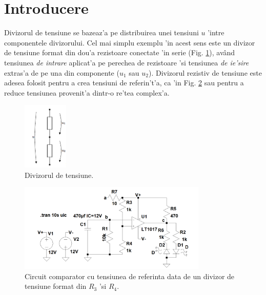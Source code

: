 \section{Introducere}

\begin{summary}
  Divizorul de tensiune se bazeaz'a pe distribuirea unei tensiuni $u$ 'intre componentele divizorului. Cel mai simplu exemplu 'in acest sens este un divizor de tensiune format din dou'a rezistoare conectate 'in serie (Fig. \ref{fig:divizor_schema_exemplu}), av\^and tensiunea \textit{de intrare} aplicat'a pe perechea de rezistoare 'si tensiunea \textit{de ie'sire} extras'a de pe una din componente ($u_1$ sau $u_2$). Divizorul rezistiv de tensiune este adesea folosit pentru a crea tensiuni de referin't'a, ca 'in Fig. \ref{fig:comparator_cu_divizor} sau pentru a reduce tensiunea provenit'a dintr-o re'tea complex'a.
\end{summary}

\begin{figure}[!b]
	\centering
		\includegraphics[width=0.19\textwidth]{laborator_01/figuri/divizor_schema_exemplu}
	\caption{Divizorul de tensiune.}
	\label{fig:divizor_schema_exemplu}
\end{figure}

\begin{figure}
	\centering
		\includegraphics[width=0.8\textwidth]{laborator_01/figuri/comparator_cu_divizor}
	\caption{Circuit comparator cu tensiunea de referinta data de un divizor de tensiune format din $R_3$ 'si $R_4$.}
	\label{fig:comparator_cu_divizor}
\end{figure}

